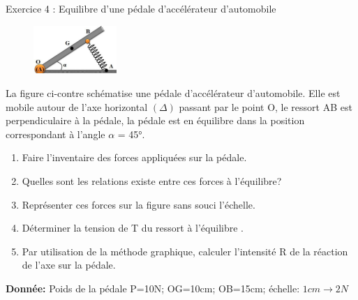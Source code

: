 \documentclass[12pt, french]{article}
\begin{document}
\begin{Box2}{Exercice 4 : Equilibre d’une pédale d'accélérateur d'automobile }

	\begin{figure}
  \begin{center}
	\includegraphics[width=0.28\textwidth]{./img/ex03.png}
  \end{center}
\end{figure}


La figure ci-contre schématise une pédale d'accélérateur
d'automobile. Elle est mobile autour de l'axe horizontal $(\Delta)$ passant
par le point O, le ressort AB est perpendiculaire à la pédale, la pédale
est en équilibre dans la position \\correspondant à l'angle $\alpha$ = 45°.

\begin{enumerate}
\item  Faire l’inventaire des forces appliquées sur la pédale.
\item  Quelles sont les relations existe entre ces forces à l'équilibre?
\item  Représenter ces forces sur la figure sans souci l'échelle.
\item  Déterminer la tension de T du ressort à l'équilibre .
\item  Par utilisation de la méthode graphique, calculer l'intensité R de la réaction de l'axe sur la pédale.
\end{enumerate}

\textbf{Donnée: } Poids de la pédale P=10N; OG=10cm; OB=15cm; échelle: $1cm \rightarrow 2N$

\end{Box2}
\end{document}
